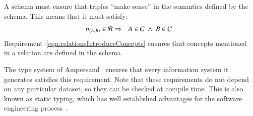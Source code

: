\documentclass{elsarticle}
\begin{document}
   A schema must ensure that triples ``make sense'' in the semantics defined by the schema.
   This means that it must satisfy:
\begin{eqnarray}
   \text{\it n\/}_{\langle{A},{B}\rangle}\in\mathcal{R}&\Rightarrow&A\in\mathcal{C}\ \wedge\ B\in\mathcal{C}
   \label{eqn:relationsIntroduceConcepts}
\end{eqnarray}
   Requirement~\ref{eqn:relationsIntroduceConcepts} ensures that concepts mentioned in a relation are defined in the schema.

   The type system of Ampersand~\cite{vdWoude2011} ensures that every information system it generates satisfies this requirement.
   Note that these requirements do not depend on any particular dataset,
   so they can be checked at compile time.
   This is also known as static typing,
   which has well established advantages for the software engineering process~\cite{HanenbergKRTS14,Petersen2014}.

\end{document}
